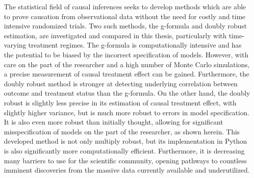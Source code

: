 
The statistical field of causal inferences seeks to develop methods which are able to prove causation from observational data without the need for costly and time intensive randomized trials.  Two such methods, the g-formula and doubly robust estimation, are investigated and compared in this thesis, particularly with time-varying treatment regimes.  The g-formula is computationally intensive and has the potential to be biased by the incorrect specification of models.  However, with care on the part of the researcher and a high number of Monte Carlo simulations, a precise measurement of causal treatment effect can be gained.  Furthermore, the doubly robust method is stronger at detecting underlying correlation between outcome and treatment status than the g-formula.  On the other hand, the doubly robust is slightly less precise in its estimation of causal treatment effect, with slightly higher variance, but is much more robust to errors in model specification.  It is also even more robust than initially thought, allowing for significant misspecification of models on the part of the researcher, as shown herein.   This developed method is not only multiply robust, but its implementation in Python is also significantly more computationally efficient.  Furthermore, it is decreasing many barriers to use for the scientific community, opening pathways to countless imminent discoveries from the massive data currently available and underutilized.  
